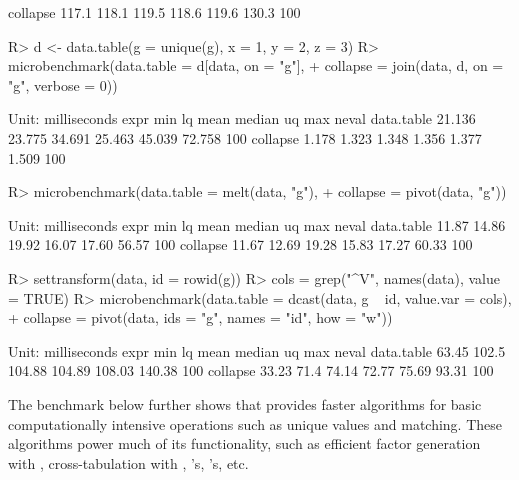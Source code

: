 \documentclass[article]{jss}
\newcommand{\fct}[1]{\code{#1()}}
\begin{document}
\begin{Schunk}
\begin{Soutput}
   collapse 117.1 118.1 119.5  118.6 119.6 130.3   100
\end{Soutput}
\begin{Sinput}
R> d <- data.table(g = unique(g), x = 1, y = 2, z = 3)
R> microbenchmark(data.table = d[data, on = "g"],
+                 collapse = join(data, d, on = "g", verbose = 0))
\end{Sinput}
\begin{Soutput}
Unit: milliseconds
       expr    min     lq   mean median     uq    max neval
 data.table 21.136 23.775 34.691 25.463 45.039 72.758   100
   collapse  1.178  1.323  1.348  1.356  1.377  1.509   100
\end{Soutput}
\begin{Sinput}
R> microbenchmark(data.table = melt(data, "g"),
+                 collapse = pivot(data, "g"))
\end{Sinput}
\begin{Soutput}
Unit: milliseconds
       expr   min    lq  mean median    uq   max neval
 data.table 11.87 14.86 19.92  16.07 17.60 56.57   100
   collapse 11.67 12.69 19.28  15.83 17.27 60.33   100
\end{Soutput}
\begin{Sinput}
R> settransform(data, id = rowid(g))
R> cols = grep("^V", names(data), value = TRUE)
R> microbenchmark(data.table = dcast(data, g ~ id, value.var = cols),
+            collapse = pivot(data, ids = "g", names = "id", how = "w"))
\end{Sinput}
\begin{Soutput}
Unit: milliseconds
       expr   min    lq   mean median     uq    max neval
 data.table 63.45 102.5 104.88 104.89 108.03 140.38   100
   collapse 33.23  71.4  74.14  72.77  75.69  93.31   100
\end{Soutput}
\end{Schunk}
%
The benchmark below further shows that  provides faster algorithms for basic computationally intensive operations such as unique values and matching. These algorithms power much of its functionality, such as efficient factor generation with \fct{qF}, cross-tabulation with \fct{qtab}, \fct{join}'s, \fct{pivot}'s, etc.
%
\end{document}
